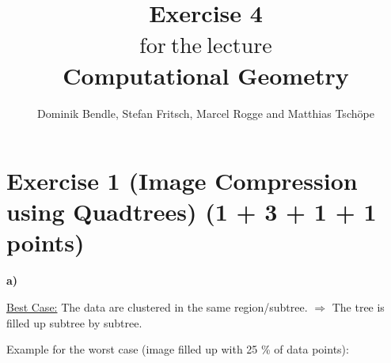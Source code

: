 \documentclass[english, fontsize=12pt, paper=a4, twoside=false, draft=true, pagesize=auto, version=last, DIV=16]{scrartcl}
\theoremstyle{break}
\begin{document}
\title{
\vspace*{-10mm}
Exercise 4 \\[-3pt]
{\Large $\mathrm{for \ the \ lecture}$} \\[-3pt]
{\LARGE \textbf{Computational Geometry}}
}
\author{Dominik Bendle, Stefan Fritsch, Marcel Rogge and Matthias Tschöpe}
\maketitle
\vspace*{-10mm}

\section*{\large Exercise 1 (Image Compression using Quadtrees) {\normalsize \hfill (1 + 3 + 1 + 1 points)}}
\textbf{a)} \par
\underline{Best Case:} The data are clustered in the same region/subtree.
$\Rightarrow$ The tree is filled up subtree by subtree. \par
Example for the worst case (image filled up with 25 \% of data points): \par
\vspace*{-7mm}
\begin{minipage}[t]{0.48\textwidth}
\begin{figure}[H]
\centering
{}
\end{figure} \par
\end{minipage} \hspace*{5mm}
\end{document}

